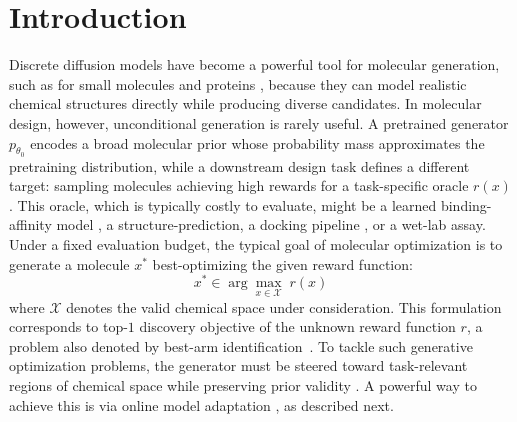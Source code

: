 \section{Introduction}

Discrete diffusion models have become a powerful tool for molecular generation, such as for small molecules \citep{leeGenMolDrugDiscovery2025, schiffSimpleGuidanceMechanisms2025} and proteins \citep{wangDiffusionLanguageModels2024}, because they can model realistic chemical structures directly while producing diverse candidates.
In molecular design, however, unconditional generation is rarely useful. 
A pretrained generator $p_{\theta_0}$ encodes a broad molecular prior whose probability mass approximates the pretraining distribution, while a downstream design task defines a different target: sampling molecules achieving high rewards for a task-specific oracle $r(x)$. This oracle, which is typically costly to evaluate, might be a learned binding-affinity model \citep{jiangFlashAffinityBridgingAccuracySpeed}, a structure-prediction, a docking pipeline \citep{passaro2025boltz2}, or a wet-lab assay. Under a fixed evaluation budget, the typical goal of molecular optimization is to generate a molecule $x^*$ best-optimizing the given reward function:
\begin{equation}
    x^* \in \arg\max_{x \in \mathcal{X}} \; r(x) \label{eq:design_objective}
\end{equation}
where $\mathcal{X}$ denotes the valid chemical space under consideration.
This formulation corresponds to top-$1$ discovery objective of the unknown reward function $r$, a problem also denoted by best-arm identification~\citep[e.g.,][]{lattimore2020bandit}. To tackle such generative optimization problems, the generator must be steered toward task-relevant regions of chemical space while preserving prior validity \citep{gutjahr2025constrained, HowArtificialIntelligence,  ueharaInferenceTimeAlignmentDiffusion2025}.
A powerful way to achieve this is via online model adaptation \citep{yangSteeringGenerativeModels2025, stoccoGuidingGenerativeModels2025, ueharaFeedbackEfficientOnline2024, rector-brooksSteeringMaskedDiscrete2024, suIterativeDistillationRewardGuided2025, ueharaRewardGuidedIterativeRefinement2025, yangSteeringGenerativeModels2025, stoccoGuidingGenerativeProtein2025, stoccoGuidingGenerativeModels2025, liCAGenMolConditionAwareDiffusion2026, olivecronaMolecularNovoDesign2017, blalockFunctionalAlignmentProtein2025}, as described next.



